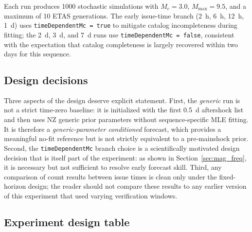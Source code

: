\documentclass[12pt,letterpaper]{article}
\newcommand{\Mc}{M_c}
\begin{document}
Each run produces 1000 stochastic simulations with $\Mc=3.0$,
$M_{\mathrm{max}}=9.5$, and a maximum of 10 ETAS generations.
The early issue-time branch (2~h, 6~h, 12~h, 1~d) uses
\texttt{timeDependentMc = true} to mitigate catalog incompleteness during
fitting; the 2~d, 3~d, and 7~d runs use \texttt{timeDependentMc = false},
consistent with the expectation that catalog completeness is largely recovered
within two days for this sequence.

\subsection{Design decisions}

Three aspects of the design deserve explicit statement.
First, the \emph{generic} run is not a strict time-zero baseline: it is
initialized with the first 0.5~d aftershock list and then uses NZ generic
prior parameters without sequence-specific MLE fitting. It is therefore a
\emph{generic-parameter conditioned} forecast, which provides a meaningful
no-fit reference but is not strictly equivalent to a pre-mainshock prior.
Second, the \texttt{timeDependentMc} branch choice is a scientifically
motivated design decision that is itself part of the experiment: as shown in
Section~\ref{sec:mag_freq}, it is necessary but not sufficient to resolve early
forecast skill.
Third, any comparison of count results between issue times is clean only under
the fixed-horizon design; the reader should not compare these results to any
earlier version of this experiment that used varying verification windows.

\subsection{Experiment design table}
\end{document}
